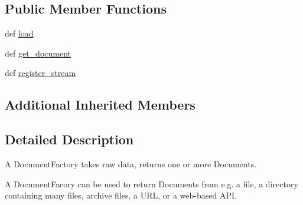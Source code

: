 \subsection*{Public Member Functions}
\begin{DoxyCompactItemize}
\item 
def \hyperlink{classcheshire3_1_1base_objects_1_1_document_factory_aa628a33166ebe7ec73b909ddcbe8136b}{load}
\item 
def \hyperlink{classcheshire3_1_1base_objects_1_1_document_factory_a7de842aa876ddabb37ead4061e394221}{get\-\_\-document}
\item 
def \hyperlink{classcheshire3_1_1base_objects_1_1_document_factory_a04eab0cb44ca363cface0c6056221848}{register\-\_\-stream}
\end{DoxyCompactItemize}
\subsection*{Additional Inherited Members}


\subsection{Detailed Description}
\begin{DoxyVerb}A DocumentFactory takes raw data, returns one or more Documents.

A DocumentFacory can be used to return Documents from e.g. a file, a 
directory containing many files, archive files, a URL, or a web-based API.
\end{DoxyVerb}
 

